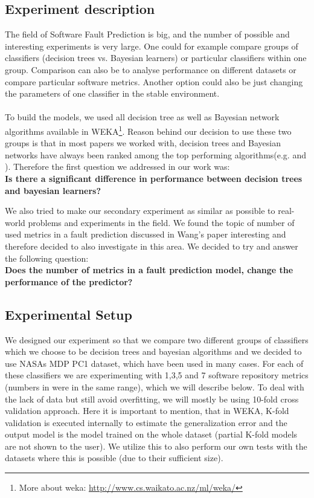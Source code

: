 \subsection{Experiment description}
The field of Software Fault Prediction is big, and the number of possible and interesting experiments is very large. One could for example compare groups of classifiers (decision trees vs. Bayesian learners) or particular classifiers within one group. Comparison can also be to analyse performance on different datasets or compare particular software metrics. Another option could also be just changing the parameters of one classifier in the stable environment.\\\\
To build the models, we used all decision tree as well as Bayesian network algorithms available in WEKA\footnote{More about weka: \url{http://www.cs.waikato.ac.nz/ml/weka/}}. Reason behind our decision to use these two groups is that in most papers we worked with, decision trees and Bayesian networks have always been ranked among the top performing algorithms(e.g. \cite{malhotra2015systematic} and \cite{shivaji2009reducing}). Therefore the first question we addressed in our work was: \\
\textbf{Is there a significant difference in performance between decision trees and bayesian learners?}

We also tried to make our secondary experiment as similar as possible to real-world problems and experiments in the field. We found the topic of number of used metrics in a fault prediction discussed in Wang's paper\cite{wang2011many} interesting and therefore decided to also investigate in this area. We decided to try and answer the following question:\\
\textbf{Does the number of metrics in a fault prediction model, change the performance of the predictor?}\\

\subsection{Experimental Setup}
We designed our experiment so that we compare two different groups of classifiers which we choose to be decision trees and bayesian algorithms and we decided to use NASAs MDP PC1 dataset, which have been used in many cases. For each of these classifiers we are experimenting with 1,3,5 and 7 software repository metrics (numbers in \cite{wang2011many} were in the same range), which we will describe below. To deal with the lack of data but still avoid overfitting, we will mostly be using 10-fold cross validation approach. Here it is important to mention, that in WEKA, K-fold validation is executed internally to estimate the generalization error and the output model is the model trained on the whole dataset (partial K-fold models are not shown to the user). We utilize this to also perform our own tests with the datasets where this is possible (due to their sufficient size).
